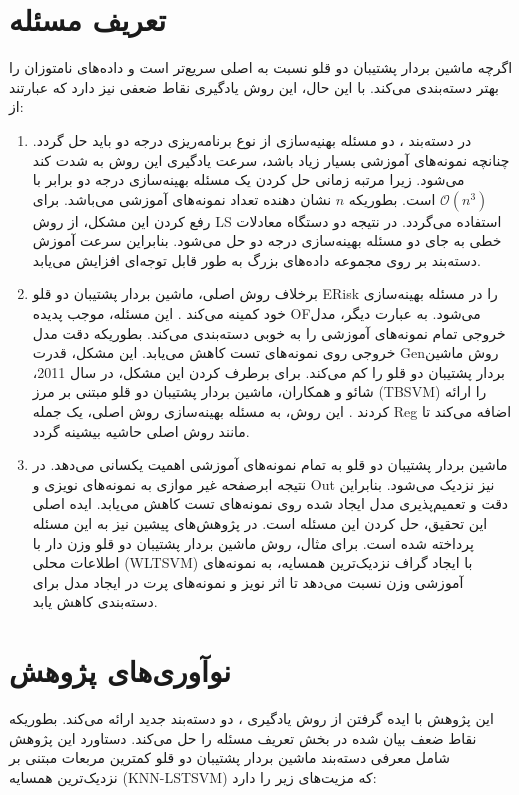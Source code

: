 \section{تعریف مسئله} \label{sec:1:2}
اگرچه ماشین بردار پشتیبان دو قلو نسبت به  اصلی سریع‌تر است و داده‌های نامتوزان را بهتر دسته‌بندی می‌کند. با این حال، این روش یادگیری نقاط ضعفی نیز دارد که عبارتند از:
\begin{enumerate}
	\item 	در دسته‌بند ، دو مسئله بهنیه‌سازی از نوع برنامه‌ریزی درجه دو باید حل گردد. چنانچه نمونه‌های آموزشی بسیار زیاد باشد، سرعت یادگیری این روش به شدت کند می‌شود. زیرا مرتبه زمانی حل کردن یک مسئله بهینه‌سازی درجه دو برابر با $\mathcal{O}(n^3)$ است. بطوریکه $n$ نشان دهنده تعداد نمونه‌های آموزشی می‌باشد. برای رفع کردن این مشکل، از روش \gls{LS}  \cite{kumar2009} استفاده می‌گردد. در نتیجه دو دستگاه معادلات خطی به جای دو مسئله بهینه‌سازی درجه دو حل می‌شود. بنابراین سرعت آموزش دسته‌بند بر روی مجموعه داده‌های بزرگ به طور قابل توجه‌ای افزایش می‌یابد.
	\item برخلاف روش  اصلی، ماشین بردار پشتیبان دو قلو \gls{ERisk} را در مسئله بهینه‌سازی خود کمینه می‌کند .\cite{shao2011} این مسئله، موجب پدیده  \gls{OF}می‌شود. به عبارت دیگر، مدل خروجی تمام نمونه‌های آموزشی را به خوبی دسته‌بندی می‌کند. بطوریکه دقت مدل خروجی روی نمونه‌های تست کاهش می‌یابد. این مشکل، قدرت  \gls{Gen}روش ماشین بردار پشتیبان دو قلو را کم می‌کند. برای برطرف کردن این مشکل، در سال 2011، شائو و همکاران، ماشین بردار پشتیبان دو قلو مبتنی بر مرز  (\gls{TBSVM}) را ارائه کردند \cite{shao2011}. این روش، به مسئله بهینه‌سازی روش  اصلی، یک جمله  \gls{Reg} اضافه می‌کند تا مانند روش  اصلی حاشیه بیشینه گردد.
	\item ماشین بردار پشتیبان دو قلو به تمام نمونه‌های آموزشی اهمیت یکسانی می‌دهد. در نتیجه ابرصفحه غیر موازی به نمونه‌های نویزی و \gls{Out} نیز نزدیک می‌شود. بنابراین دقت و تعمیم‌پذیری مدل ایجاد شده روی نمونه‌های تست کاهش می‌یابد. ایده اصلی این تحقیق، حل کردن این مسئله است. در پژوهش‌های پیشین نیز به این مسئله پرداخته شده است. برای مثال، روش ماشین بردار پشتیبان دو قلو وزن دار با اطلاعات محلی (\gls{WLTSVM}) \cite{ye2012} با ایجاد گراف نزدیک‌ترین همسایه، به نمونه‌های آموزشی وزن نسبت می‌دهد تا اثر نویز و نمونه‌های پرت در ایجاد مدل برای دسته‌بندی کاهش یابد.
\end{enumerate}

\section{نوآوری‌های پژوهش} \label{sec:1:3}
این پژوهش با ایده گرفتن از روش یادگیری   \cite{ye2012}، دو دسته‌بند جدید ارائه می‌کند. بطوریکه نقاط ضعف بیان شده در بخش تعریف مسئله را حل می‌کند. دستاورد این پژوهش شامل معرفی دسته‌بند ماشین بردار پشتیبان دو قلو کمترین مربعات مبتنی بر نزدیک‌ترین همسایه \cite{mir2018} (\gls{KNN-LSTSVM}) که مزیت‌های زیر را دارد:


